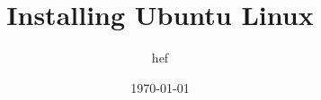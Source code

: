 \documentclass[hyperref={pdfpagelabels=false}]{beamer}
\title{Installing Ubuntu Linux}
\author{hef}
\date{\today}
\begin{document}
\frame{\titlepage}
\section[outline]{}
\frame{\tableofcontents}
\end{document}
